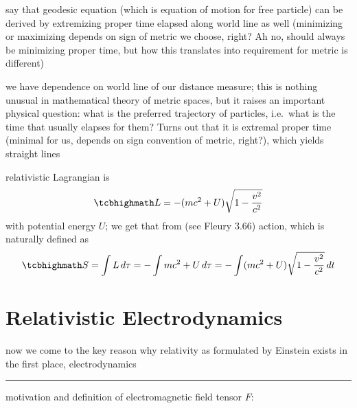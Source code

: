 \documentclass[../relativity_main.tex]{subfiles}
\begin{document}
say that geodesic equation (which is equation of motion for free particle) can be derived by extremizing proper time elapsed along world line as well (minimizing or maximizing depends on sign of metric we choose, right? Ah no, should always be minimizing proper time, but how this translates into requirement for metric is different)


we have dependence on world line of our distance measure; this is nothing unusual in mathematical theory of metric spaces, but it raises an important physical question: what is the preferred trajectory of particles, i.e.~what is the time that usually elapses for them? Turns out that it is extremal proper time (minimal for us, depends on sign convention of metric, right?), which yields straight lines


relativistic Lagrangian is
\begin{equation}
	\eqbox{
	L = - (m c^2 + U) \sqrt{1 - \frac{v^2}{c^2}}
	}
\end{equation}
with potential energy $U$; we get that from (see Fleury 3.66) action, which is naturally defined as
\begin{equation}
	\eqbox{
	S = \int L \, d\tau = - \int m c^2 + U \, d\tau = - \int (m c^2 + U) \sqrt{1 - \frac{v^2}{c^2}} \, dt
	}
\end{equation}



\newpage



	\section{Relativistic Electrodynamics}
now we come to the key reason why relativity as formulated by Einstein exists in the first place, electrodynamics


\hrule

motivation and definition of electromagnetic field tensor $F$:
\end{document}
